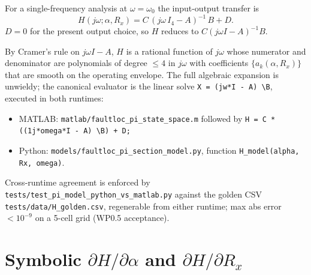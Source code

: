 \documentclass[11pt,a4paper]{article}
\begin{document}
For a single-frequency analysis at $\omega = \omega_0$ the
input-output transfer is
\begin{equation}
  H(j\omega; \alpha, R_x)
     = C\,(j\omega\,I_4 - A)^{-1}\,B + D.
\end{equation}
$D = 0$ for the present output choice, so $H$ reduces to
$C(j\omega I - A)^{-1} B$.

By Cramer's rule on $j\omega I - A$, $H$ is a rational function of
$j\omega$ whose numerator and denominator are polynomials of degree
$\leq 4$ in $j\omega$ with coefficients $\{a_k(\alpha,R_x)\}$ that
are smooth on the operating envelope.  The full algebraic expansion is
unwieldy; the canonical evaluator is the linear solve
\texttt{X = (jw*I - A) \textbackslash B}, executed in
both runtimes:
\begin{itemize}[leftmargin=2em]
  \item MATLAB:  \texttt{matlab/faultloc\_pi\_state\_space.m}
                 followed by \texttt{H = C * ((1j*omega*I - A) \textbackslash B) + D;}
  \item Python:  \texttt{models/faultloc\_pi\_section\_model.py},
                 function \texttt{H\_model(alpha, Rx, omega)}.
\end{itemize}
Cross-runtime agreement is enforced by
\texttt{tests/test\_pi\_model\_python\_vs\_matlab.py} against the
golden CSV \texttt{tests/data/H\_golden.csv}, regenerable from
either runtime; max abs error $< 10^{-9}$ on a 5-cell grid (WP0.5
acceptance).

\section{Symbolic $\partial H/\partial\alpha$ and $\partial H/\partial R_x$}\label{sec:dHdtheta}
\end{document}

